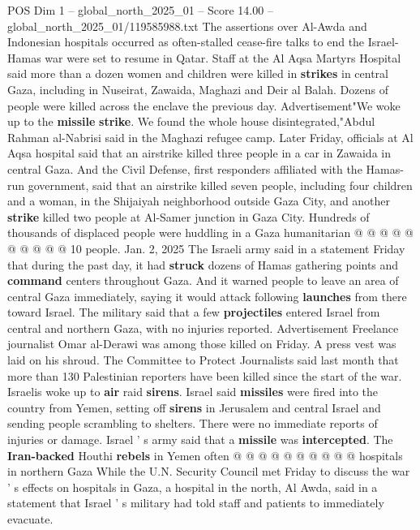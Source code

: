 \begin{textsample}{POS Dim 1 – global\_north\_2025\_01 – Score 14.00 – global\_north\_2025\_01/119585988.txt}  \label{ex:f1_pos_399}
The assertions over Al-Awda and Indonesian hospitals occurred as often-stalled cease-fire talks to end the Israel-Hamas war were set to resume in Qatar.
Staff at the Al Aqsa Martyrs Hospital said more than a dozen women and children were killed in \textbf{strikes} in central Gaza, including in Nuseirat, Zawaida, Maghazi and Deir al Balah.
Dozens of people were killed across the enclave the previous day.
Advertisement"We woke up to the \textbf{missile} \textbf{strike}.
We found the whole house disintegrated,"Abdul Rahman al-Nabrisi said in the Maghazi refugee camp.
Later Friday, officials at Al Aqsa hospital said that an airstrike killed three people in a car in Zawaida in central Gaza.
And the Civil Defense, first responders affiliated with the Hamas-run government, said that an airstrike killed seven people, including four children and a woman, in the Shijaiyah neighborhood outside Gaza City, and another \textbf{strike} killed two people at Al-Samer junction in Gaza City.
Hundreds of thousands of displaced people were huddling in a Gaza humanitarian @ @ @ @ @ @ @ @ @ @ 10 people.
Jan. 2, 2025 The Israeli army said in a statement Friday that during the past day, it had \textbf{struck} dozens of Hamas gathering points and \textbf{command} centers throughout Gaza.
And it warned people to leave an area of central Gaza immediately, saying it would attack following \textbf{launches} from there toward Israel.
The military said that a few \textbf{projectiles} entered Israel from central and northern Gaza, with no injuries reported.
Advertisement Freelance journalist Omar al-Derawi was among those killed on Friday.
A press vest was laid on his shroud.
The Committee to Protect Journalists said last month that more than 130 Palestinian reporters have been killed since the start of the war.
Israelis woke up to \textbf{air} raid \textbf{sirens}.
Israel said \textbf{missiles} were fired into the country from Yemen, setting off \textbf{sirens} in Jerusalem and central Israel and sending people scrambling to shelters.
There were no immediate reports of injuries or damage.
Israel ' s army said that a \textbf{missile} was \textbf{intercepted}.
The \textbf{Iran-backed} Houthi \textbf{rebels} in Yemen often @ @ @ @ @ @ @ @ @ @ hospitals in northern Gaza While the U.N.
Security Council met Friday to discuss the war ' s effects on hospitals in Gaza, a hospital in the north, Al Awda, said in a statement that Israel ' s military had told staff and patients to immediately evacuate.

\end{textsample}
